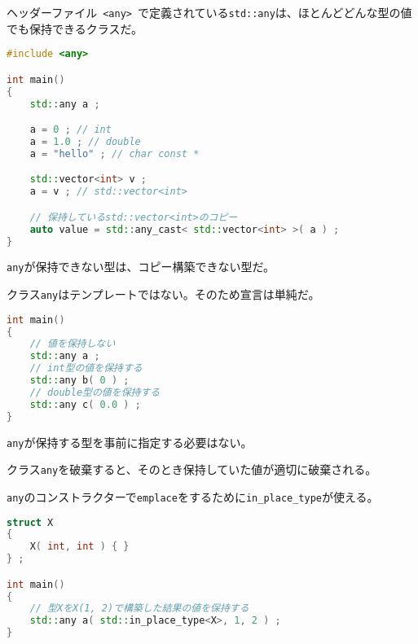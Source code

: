 %

%

ヘッダーファイル~\lstinline!<any>!~で定義されている\lstinline!std::any!は、ほとんどどんな型の値でも保持できるクラスだ。

\begin{lstlisting}[language=C++]
#include <any>

int main()
{
    std::any a ;

    a = 0 ; // int
    a = 1.0 ; // double
    a = "hello" ; // char const *

    std::vector<int> v ;
    a = v ; // std::vector<int>

    // 保持しているstd::vector<int>のコピー
    auto value = std::any_cast< std::vector<int> >( a ) ;
}
\end{lstlisting}

\lstinline!any!が保持できない型は、コピー構築できない型だ。

%

クラス\lstinline!any!はテンプレートではない。そのため宣言は単純だ。

\begin{lstlisting}[language=C++]
int main()
{
    // 値を保持しない
    std::any a ;
    // int型の値を保持する
    std::any b( 0 ) ;
    // double型の値を保持する
    std::any c( 0.0 ) ;
}
\end{lstlisting}

\lstinline!any!が保持する型を事前に指定する必要はない。

クラス\lstinline!any!を破棄すると、そのとき保持していた値が適切に破棄される。

%

\lstinline!any!のコンストラクターで\lstinline!emplace!をするために\lstinline!in_place_type!が使える。

\begin{lstlisting}[language=C++]
struct X
{
    X( int, int ) { }
} ;

int main()
{
    // 型XをX(1, 2)で構築した結果の値を保持する
    std::any a( std::in_place_type<X>, 1, 2 ) ;
}
\end{lstlisting}

